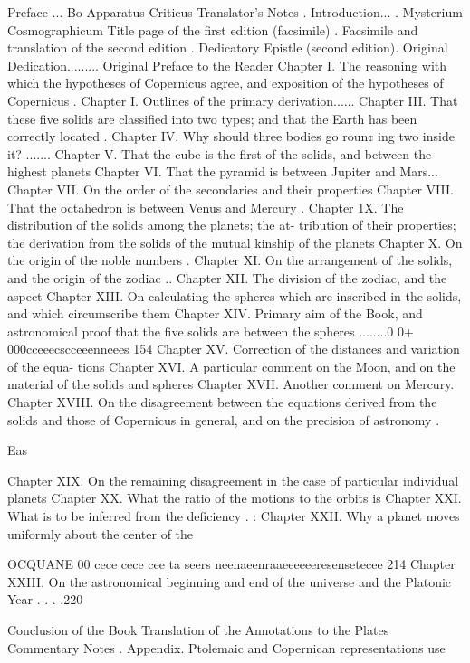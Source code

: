 \documentclass{article}
\begin{document}
Preface ... Bo
Apparatus Criticus
Translator’s Notes .
Introduction... .
Mysterium Cosmographicum
Title page of the first edition (facsimile) .
Facsimile and translation of the second edition .
Dedicatory Epistle (second edition).
Original Dedication.........
Original Preface to the Reader
Chapter I. The reasoning with which the hypotheses of Copernicus
agree, and exposition of the hypotheses of Copernicus .
Chapter I. Outlines of the primary derivation......
Chapter III. That these five solids are classified into two types; and that
the Earth has been correctly located .
Chapter IV. Why should three bodies go roun¢
ing two inside it? .......
Chapter V. That the cube is the first of the solids, and between the
highest planets
Chapter VI. That the pyramid is between Jupiter and Mars...
Chapter VII. On the order of the secondaries and their properties
Chapter VIII. That the octahedron is between Venus and Mercury .
Chapter 1X. The distribution of the solids among the planets; the at-
tribution of their properties; the derivation from the solids of the
mutual kinship of the planets
Chapter X. On the origin of the noble numbers .
Chapter XI. On the arrangement of the solids, and the origin of the
zodiac ..
Chapter XII. The division of the zodiac, and the aspect
Chapter XIII. On calculating the spheres which are inscribed in the
solids, and which circumscribe them
Chapter XIV. Primary aim of the Book, and astronomical proof that
the five solids are between the spheres ........0 0+ 000cceeecscceeenneees 154
Chapter XV. Correction of the distances and variation of the equa-
tions
Chapter XVI. A particular comment on the Moon, and on the material
of the solids and spheres
Chapter XVII. Another comment on Mercury.
Chapter XVIII. On the disagreement between the equations derived
from the solids and those of Copernicus in general, and on the precision
of astronomy .



Eas


Chapter XIX. On the remaining disagreement in the case of particular
individual planets
Chapter XX. What the ratio of the motions to the orbits is
Chapter XXI. What is to be inferred from the deficiency . :
Chapter XXII. Why a planet moves uniformly about the center of the

OCQUANE 00 cece cece cee ta seers neenaeenraaeeeeeeresensetecee 214
Chapter XXIII. On the astronomical beginning and end of the universe
and the Platonic Year . . . .220

Conclusion of the Book
Translation of the Annotations to the Plates
Commentary Notes .
Appendix. Ptolemaic and Copernican representations use
\end{document}
